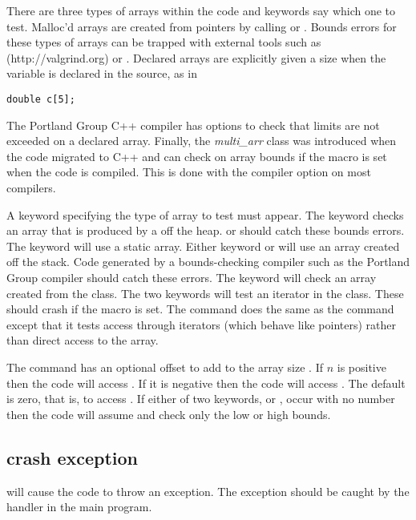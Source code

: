 There are three types of arrays within the code and keywords say which
one to test.
Malloc'd arrays are created from pointers by calling
or .
Bounds errors for these types of arrays can be trapped with
external tools such as  (http://valgrind.org)
or .
Declared arrays are explicitly given a size when the variable
is declared in the source, as in
\begin{verbatim}
double c[5];
\end{verbatim}
The Portland Group C++ compiler has options to check that limits are not
exceeded on a declared array.
Finally, the \emph{multi\_arr} class was introduced
when the code migrated to C++ and can check on array bounds if the macro
 is set when the code is compiled.
This is done with the
compiler option  on most compilers.

A keyword specifying the type of array to test must appear.
The keyword
 checks an array that is produced by a
 off the heap.
or  should catch these bounds errors.
The keyword
 will use
a static array.
Either keyword  or  will use an array created
off the stack.
Code generated by a bounds-checking compiler such as the
Portland Group compiler should catch these errors.
The keyword
 will
check an array created from the  class.
The two keywords
 will test an iterator in the
 class.
These should crash if
the macro  is set.
The  command does
the same as the  command
except that it tests access
through iterators (which behave like pointers) rather
than direct access to the array.

The  command has an optional offset
to add to the array size .
If $n$ is positive then the code will access
.
If it is negative then the code will access .
The default is zero,
that is, to access .
If either of two keywords,  or
, occur with no number then the code will assume  and check only the low or high bounds.

\subsection{crash exception} will cause
the code to throw an exception.
The exception should be caught by the handler in the
main program.

